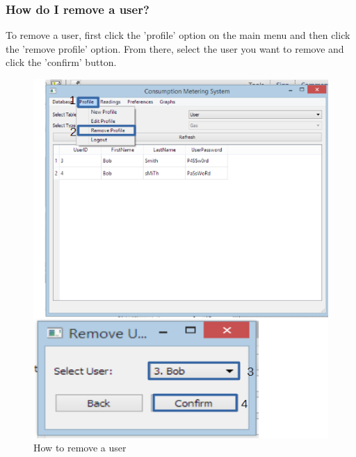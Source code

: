 \subsubsection{How do I remove a user?}\label{question:remove_user}
To remove a user, first click the 'profile' option on the main menu and then click the 'remove profile' option. From there, select the user you want to remove and click the 'confirm' button.
\begin{figure}[H]
	\includegraphics{./manual/images/remove_user.png}
	\caption{How to remove a user}
\end{figure}

